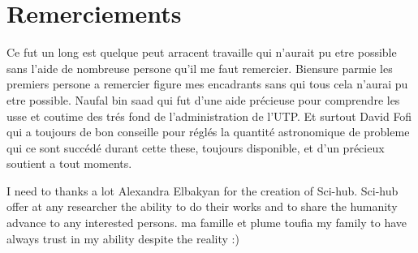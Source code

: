 \documentclass[english]{spimubphdthesis}
\begin{document}
\chapter*{Remerciements}
Ce fut un long est  quelque peut arracent travaille qui n'aurait pu etre possible sans l'aide de nombreuse persone  qu'il me faut remercier.
Biensure parmie les premiers persone a remercier figure mes encadrants sans qui tous cela n'aurai pu etre possible.
Naufal bin saad qui fut d'une aide précieuse  pour comprendre  les usse et coutime des trés fond de l'administration de l'UTP.
Et surtout David Fofi qui a toujours de bon conseille pour réglés la quantité astronomique de probleme qui ce sont succédé durant cette these, toujours disponible, et d'un précieux soutient a tout moments. 

I need to thanks a lot Alexandra Elbakyan for the  creation  of Sci-hub. Sci-hub  offer at any researcher the ability to do their works and to share the humanity advance to any interested persons.
 ma famille  et plume toufia 
 my family to have always trust in my ability despite the reality :)
\tableofcontents

\mainmatter
\end{document}
